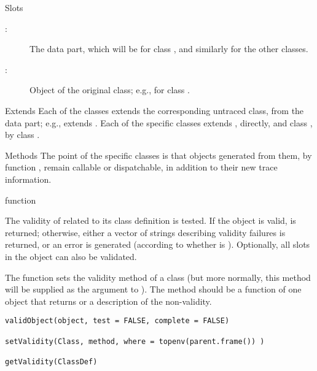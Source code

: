 %
\begin{Section}{Slots}
\begin{description}

\item[:] The data part, which will be 
for class , and similarly for the other
classes.
\item[:] Object of the original class; e.g.,
 for class . 

\end{description}

\end{Section}
%
\begin{Section}{Extends}
Each of the classes extends the corresponding untraced class, from the
data part; e.g.,  extends .
Each of the specific classes extends , directly,
and class , by class .
\end{Section}
%
\begin{Section}{Methods}
The point of the specific classes is that objects generated from them,
by function , remain callable or dispatchable, in
addition to their new trace information.
\end{Section}
%
\begin{SeeAlso}\relax
 function  
\end{SeeAlso}
%
\begin{Description}\relax
The validity of  related to its class definition is
tested.  If the object is valid,  is returned; otherwise,
either a vector of strings describing validity failures is returned,
or an error is generated (according to whether  is
).  Optionally, all slots in the object can also be validated.

The function  sets the validity method of a class
(but more normally, this method will be supplied as the
 argument to ).  The method
should be a function of one object that returns  or a
description of the non-validity.
\end{Description}
%
\begin{Usage}
\begin{verbatim}
validObject(object, test = FALSE, complete = FALSE)

setValidity(Class, method, where = topenv(parent.frame()) )

getValidity(ClassDef)
\end{verbatim}
\end{Usage}
